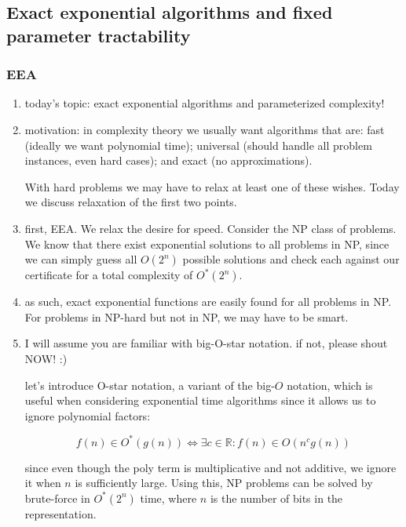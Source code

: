 \newpage
\subsection{Exact exponential algorithms and fixed parameter tractability}

\subsubsection{EEA}

\begin{enumerate}
  \item today's topic: exact exponential algorithms and parameterized
    complexity!

  \item motivation: in complexity theory we usually want algorithms that are:
    fast (ideally we want polynomial time); universal (should handle all
    problem instances, even hard cases); and exact (no approximations).

    With hard problems we may have to relax at least one of these wishes. Today
    we discuss relaxation of the first two points.

  \item first, EEA. We relax the desire for speed. Consider the NP class of
    problems. We know that there exist exponential solutions to all problems in
    NP, since we can simply guess all $O(2^n)$ possible solutions and check each
    against our certificate for a total complexity of $O^\ast(2^n)$.

  \item as such, exact exponential functions are easily found for all problems
    in NP. For problems in NP-hard but not in NP, we may have to be smart.

  \item I will assume you are familiar with big-O-star notation. if not, please
    shout NOW! :)

    \begin{textgray}
    let's introduce O-star notation, a variant of the big-$O$ notation, which
    is useful when considering exponential time algorithms since it allows us to
    ignore polynomial factors:

    $$f(n) \in O^\ast(g(n)) \iff \exists c \in \mathbb R : f(n) \in O(n^cg(n))$$

    since even though the poly term is multiplicative and not additive, we
    ignore it when $n$ is sufficiently large. Using this, NP problems can be
    solved by brute-force in $O^\ast(2^n)$ time, where $n$ is the number of bits
    in the representation.


\end{textgray}
\end{enumerate}

